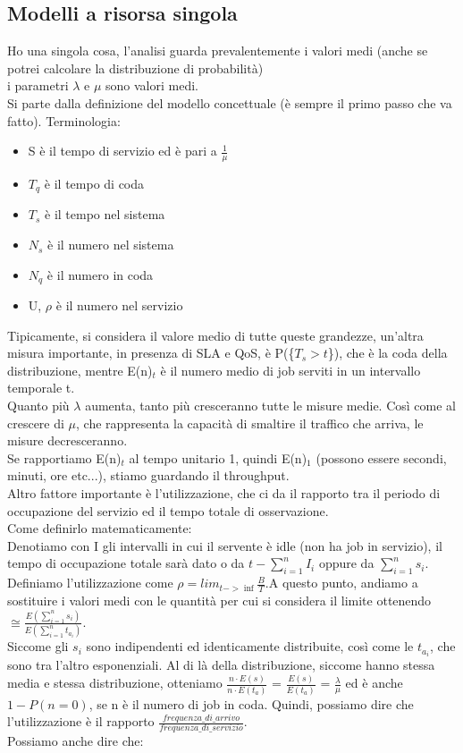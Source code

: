 \documentclass{article}
\begin{document}
\subsection{Modelli a risorsa singola}
Ho una singola cosa, l'analisi guarda prevalentemente i valori medi (anche se potrei calcolare la distribuzione di probabilità)\\
i parametri $\lambda$ e $\mu$ sono valori medi.\\ Si parte dalla definizione del modello concettuale (è sempre il primo passo che va fatto). Terminologia:
\begin{itemize}
\item S è il tempo di servizio ed è pari a $\frac{1}{\mu}$
\item $T_q$ è il tempo di coda
\item $T_s$ è il tempo nel sistema
\item $N_s$ è il numero nel sistema
\item $N_q$ è il numero in coda
\item U, $\rho$ è il numero nel servizio
\end{itemize}
Tipicamente, si considera il valore medio di tutte queste grandezze, un'altra misura importante, in  presenza di SLA e QoS, è P(\{$T_s > t$\}), che è la coda della distribuzione, mentre E(n)$_t$ è il numero medio di job serviti in un intervallo temporale t.\\ Quanto più $\lambda$ aumenta, tanto più cresceranno tutte le misure medie. Così come al crescere di $\mu$, che rappresenta la capacità di smaltire il traffico che arriva, le misure decresceranno.\\ Se rapportiamo E(n)$_t$ al tempo unitario 1, quindi E(n)$_1$ (possono essere secondi, minuti, ore etc...), stiamo guardando il throughput.\\ Altro fattore importante è l'utilizzazione, che ci da il rapporto tra il periodo di occupazione del servizio ed il tempo totale di osservazione.\\ Come definirlo matematicamente:\\
Denotiamo con I gli intervalli in cui il servente è idle (non ha job in servizio), il tempo di occupazione totale sarà dato o da $t - \sum\limits_{i = 1}^{n} I_i$ oppure da $\sum\limits_{i = 1}^{n} s_i$.\\ Definiamo l'utilizzazione come $\rho = lim_{t-> \inf} \frac{B}{T}$.A questo punto, andiamo a sostituire i valori medi con le quantità per cui si considera il limite ottenendo $\cong \frac{E(\sum\limits_{i = 1}^{n} s_i)}{E(\sum\limits_{i=1}^{n} t_{a_i})}$.\\ Siccome gli $s_i$ sono indipendenti ed identicamente distribuite, così come le $t_{a_i}$, che sono tra l'altro esponenziali. Al di là della distribuzione, siccome hanno stessa media e stessa distribuzione, otteniamo $\frac{n\cdot E(s)}{n\cdot E(t_a)}$ = $\frac{E(s)}{E(t_a)}$ = $\frac{\lambda}{\mu}$ ed è anche $1 - P(n = 0)$, se n è il numero di job in coda. Quindi, possiamo dire che l'utilizzazione è il rapporto $\frac{frequenza\_di\_arrivo}{frequenza\_di\_servizio}$.\\ Possiamo anche dire che:
\end{document}
